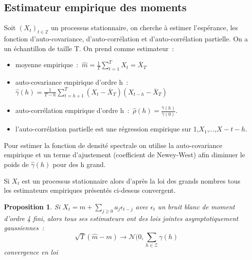 \documentclass[11pt]{scrartcl} %
\newtheorem{pro}[theorem]{Proposition}
\begin{document}
\subsection{Estimateur empirique des moments}
Soit $(X_t)_{t\in\mathbb{Z}}$ un processus stationnaire, on cherche à estimer l'espérance, les fonction d'auto-covariance, d'auto-corrélation et d'auto-corrélation partielle. On a un échantillon de taille T. On prend comme estimateur~:
\begin{itemize}
\item moyenne empirique~:~$\hat{m}=\frac{1}{T}\sum_{t=1}^TX_t=\overline{X}_T$\\
\item auto-covariance empirique d'ordre h~:~$\hat{\gamma}(h)=\frac{1}{T-h}\sum_{t=h+1}^T(X_t-\overline{X}_T)(X_{t-h}-\overline{X}_T)$\\
\item auto-corrélation empirique d'ordre h~:~$\hat{\rho}(h)=\frac{\hat{\gamma}(h)}{\hat{\gamma}(0)}$.\\
\item l'auto-corrélation partielle est une régression empirique sur 1,$X_1$,...,$X-{t-h}$.
\end{itemize}
Pour estimer la fonction de densité spectrale on utilise la auto-covariance empirique et un terme d'ajustement (coefficient de Newey-West) afin diminuer le poids de $\hat{\gamma}(h)$ pour des h grand.


Si $X_t$ est un processus stationnaire alors d'après la loi des grands nombres tous les estimateurs empiriques présentés ci-dessus convergent.

\begin{pro}
Si $X_t=m+\sum_{j\geq 0}a_j\epsilon_{t-j}$ avec $\epsilon_t$ un bruit blanc de moment d'ordre 4 fini, alors tous ses estimateurs ont des lois jointes asymptotiquement gaussiennes~:
$$
\sqrt{T}\left(\hat{m}-m\right)\rightarrow \mathcal{N}(0,\sum_{h\in\mathcal{Z}}\gamma(h)
$$
convergence en loi
\end{pro}
\end{document}
